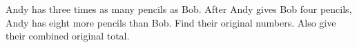 Andy has three times as many pencils as Bob. After Andy gives Bob four pencils, Andy has eight more pencils than Bob. Find their original numbers. Also give their combined original total.
